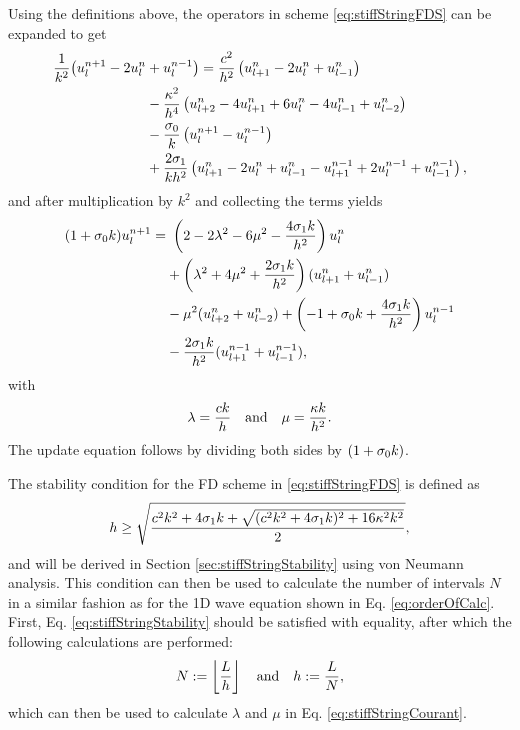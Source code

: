 Using the definitions above, 
the operators in scheme \eqref{eq:stiffStringFDS} can be expanded to get
\begin{equation}
    \begin{aligned}\label{eq:expandedStringFDS}
        \frac{1}{k^2}\big(u_l^{n+1} - 2u_l^n & + u_l^{n-1} \big) =\frac{c^2}{h^2}\left(u_{l+1}^n - 2u_l^n + u_{l-1}^n\right) \\
        &- \frac{\kappa^2}{h^4}\left(u_{l+2}^n - 4u_{l+1}^n+6u_l^n - 4u_{l-1}^n+u_{l-2}^n\right) \\ 
        &- \frac{\sigma_{0}}{k} \left(u_l^{n+1} - u_l^{n-1}\right)\\
        & + \frac{2\sigma_{1}}{kh^2}\left(u_{l+1}^n - 2u_l^n + u_{l-1}^n - u_{l+1}^{n-1} + 2u_l^{n-1} + u_{l-1}^{n-1}\right),
    \end{aligned}
\end{equation}
and after multiplication by $k^2$ and collecting the terms yields
\begin{equation}\label{eq:stiffStringUpdate}
    \begin{aligned}
        (1+\sigma_{0} k) u_l^{n+1} =&\ \left(2 - 2\lambda^2 - 6\mu^2 - \frac{4\sigma_{1} k}{h^2}\right) u_l^n\\
        & + \left(\lambda^2 + 4\mu^2 + \frac{2\sigma_{1} k}{h^2}\right) (u_{l+1}^n + u_{l-1}^n) \\
        &- \mu^2 (u_{l+2}^n + u_{l-2}^n) + \left(-1+\sigma_{0} k + \frac{4\sigma_{1} k}{h^2}\right)u_l^{n-1}\\
        & - \frac{2\sigma_{1} k}{h^2}(u_{l+1}^{n-1} + u_{l-1}^{n-1}),
    \end{aligned}
\end{equation}
with 
\begin{equation}\label{eq:stiffStringCourant}
    \lambda = \frac{ck}{h} \quad \text{and} \quad \mu = \frac{\kappa k}{h^2}.
\end{equation}
The update equation follows by dividing both sides by $(1+\sigma_{0} k)$. 

The stability condition for the FD scheme in \eqref{eq:stiffStringFDS} is defined as 
\begin{equation}\label{eq:stiffStringStability}
    h \geq \sqrt{\frac{c^2k^2+4\sigma_{1} k + \sqrt{(c^2k^2 + 4\sigma_{1} k)^2+16\kappa^2k^2}}{2}},
\end{equation}
and will be derived in Section \ref{sec:stiffStringStability} using von Neumann analysis. 
This condition can then be used to calculate the number of intervals $N$ in a similar fashion as for the 1D wave equation shown in Eq. \eqref{eq:orderOfCalc}. First, Eq. \eqref{eq:stiffStringStability} should be satisfied with equality, after which the following calculations are performed:
\begin{equation*}
    N := \floor[\frac{L}{h}] \qaq h := \frac{L}{N},
\end{equation*}
which can then be used to calculate $\lambda$ and $\mu$ in Eq. \eqref{eq:stiffStringCourant}.


